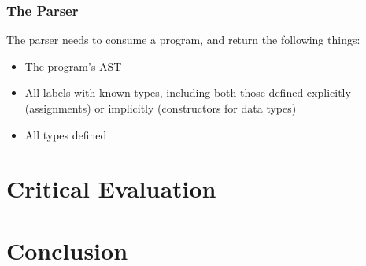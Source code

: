 \documentclass[
author={Kiran Sturt},
degree={BSc},
title={Implementing a Step by Step Evaluator for a Simple Functional Programming language},
unit={COMS30045},]{dissertation}
\begin{document}
\subsection{The Parser}
The parser needs to consume a program, and return the following things:
\begin{itemize}
    \item The program's AST
    \item All labels with known types, including both those defined explicitly (assignments) or implicitly (constructors for data types)
    \item All types defined
\end{itemize}

\chapter{Critical Evaluation}
\label{chap:evaluation}


\chapter{Conclusion}
\label{chap:conclusion}


%
%
%
\end{document}
